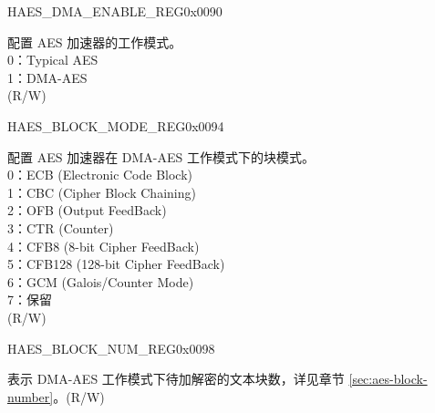 \begin{register}{H}{AES\_DMA\_ENABLE\_REG}{0x0090}\label{regdesc:AESDMAENABLEREG}
%
%
\regnewline%
\begin{regdesc}\begin{reglist}
\item [AES\_DMA\_ENABLE] 配置 AES 加速器的工作模式。\\
0：Typical AES\\
1：DMA-AES\\
(R/W)
\end{reglist}\end{regdesc}
\end{register}


\begin{register}{H}{AES\_BLOCK\_MODE\_REG}{0x0094}\label{regdesc:AESBLOCKMODEREG}
%
%
\regnewline%
\begin{regdesc}\begin{reglist}
\item [AES\_BLOCK\_MODE] 配置 AES 加速器在 DMA-AES 工作模式下的块模式。\\
0：ECB (Electronic Code Block)\\
1：CBC (Cipher Block Chaining)\\
2：OFB (Output FeedBack)\\
3：CTR (Counter)\\
4：CFB8 (8-bit Cipher FeedBack)\\
5：CFB128 (128-bit Cipher FeedBack)\\
6：GCM (Galois/Counter Mode)\\
7：保留\\
(R/W)
\end{reglist}\end{regdesc}
\end{register}


\begin{register}{H}{AES\_BLOCK\_NUM\_REG}{0x0098}\label{regdesc:AESBLOCKNUMREG}
%
\regnewline%
\begin{regdesc}\begin{reglist}
\item [AES\_BLOCK\_NUM] 表示 DMA-AES 工作模式下待加解密的文本块数，详见章节 \ref{sec:aes-block-number}。(R/W)
\end{reglist}\end{regdesc}
\end{register}


